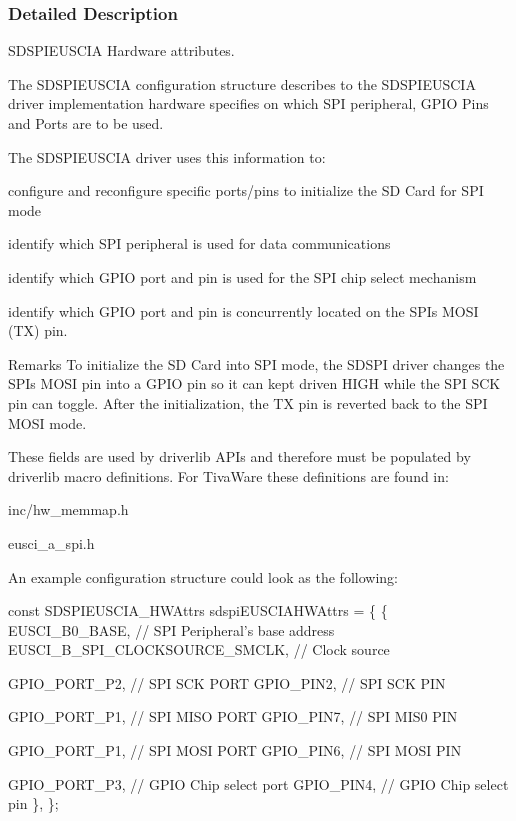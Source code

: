 \subsubsection{Detailed Description}
S\+D\+S\+P\+I\+E\+U\+S\+C\+I\+A Hardware attributes. 

The S\+D\+S\+P\+I\+E\+U\+S\+C\+I\+A configuration structure describes to the S\+D\+S\+P\+I\+E\+U\+S\+C\+I\+A driver implementation hardware specifies on which S\+P\+I peripheral, G\+P\+I\+O Pins and Ports are to be used.

The S\+D\+S\+P\+I\+E\+U\+S\+C\+I\+A driver uses this information to\+:
\begin{DoxyItemize}
\item configure and reconfigure specific ports/pins to initialize the S\+D Card for S\+P\+I mode
\item identify which S\+P\+I peripheral is used for data communications
\item identify which G\+P\+I\+O port and pin is used for the S\+P\+I chip select mechanism
\item identify which G\+P\+I\+O port and pin is concurrently located on the S\+P\+I\textquotesingle{}s M\+O\+S\+I (T\+X) pin.
\end{DoxyItemize}

\begin{DoxyRemark}{Remarks}
To initialize the S\+D Card into S\+P\+I mode, the S\+D\+S\+P\+I driver changes the S\+P\+I\textquotesingle{}s M\+O\+S\+I pin into a G\+P\+I\+O pin so it can kept driven H\+I\+G\+H while the S\+P\+I S\+C\+K pin can toggle. After the initialization, the T\+X pin is reverted back to the S\+P\+I M\+O\+S\+I mode.
\end{DoxyRemark}
These fields are used by driverlib A\+P\+Is and therefore must be populated by driverlib macro definitions. For Tiva\+Ware these definitions are found in\+:
\begin{DoxyItemize}
\item inc/hw\+\_\+memmap.\+h
\item eusci\+\_\+a\+\_\+spi.\+h
\end{DoxyItemize}

An example configuration structure could look as the following\+: 
\begin{DoxyCode}
\textcolor{keyword}{const} SDSPIEUSCIA_HWAttrs sdspiEUSCIAHWAttrs = \{
    \{
         EUSCI\_B0\_BASE, \textcolor{comment}{// SPI Peripheral's base address}
         EUSCI\_B\_SPI\_CLOCKSOURCE\_SMCLK, \textcolor{comment}{// Clock source}

         GPIO\_PORT\_P2,  \textcolor{comment}{// SPI SCK PORT}
         GPIO\_PIN2,     \textcolor{comment}{// SPI SCK PIN}

         GPIO\_PORT\_P1,  \textcolor{comment}{// SPI MISO PORT}
         GPIO\_PIN7,     \textcolor{comment}{// SPI MIS0 PIN}

         GPIO\_PORT\_P1,  \textcolor{comment}{// SPI MOSI PORT}
         GPIO\_PIN6,     \textcolor{comment}{// SPI MOSI PIN}

         GPIO\_PORT\_P3,  \textcolor{comment}{// GPIO Chip select port}
         GPIO\_PIN4,     \textcolor{comment}{// GPIO Chip select pin}
     \},
\};
\end{DoxyCode}
 

